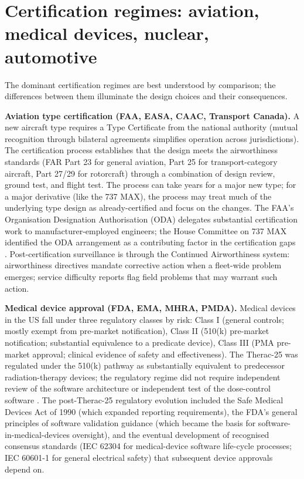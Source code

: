 \section{Certification regimes: aviation, medical devices, nuclear, automotive}

The dominant certification regimes are best understood by comparison; the differences between them illuminate the design choices and their consequences.

\textbf{Aviation type certification (FAA, EASA, CAAC, Transport Canada).} A new aircraft type requires a Type Certificate from the national authority (mutual recognition through bilateral agreements simplifies operation across jurisdictions). The certification process establishes that the design meets the airworthiness standards (FAR Part 23 for general aviation, Part 25 for transport-category aircraft, Part 27/29 for rotorcraft) through a combination of design review, ground test, and flight test. The process can take years for a major new type; for a major derivative (like the 737 MAX), the process may treat much of the underlying type design as already-certified and focus on the changes. The FAA's Organisation Designation Authorisation (ODA) delegates substantial certification work to manufacturer-employed engineers; the House Committee on 737 MAX identified the ODA arrangement as a contributing factor in the certification gaps \cite{acc:house-737max-2020}. Post-certification surveillance is through the Continued Airworthiness system: airworthiness directives mandate corrective action when a fleet-wide problem emerges; service difficulty reports flag field problems that may warrant such action.

\textbf{Medical device approval (FDA, EMA, MHRA, PMDA).} Medical devices in the US fall under three regulatory classes by risk: Class I (general controls; mostly exempt from pre-market notification), Class II (510(k) pre-market notification; substantial equivalence to a predicate device), Class III (PMA pre-market approval; clinical evidence of safety and effectiveness). The Therac-25 was regulated under the 510(k) pathway as substantially equivalent to predecessor radiation-therapy devices; the regulatory regime did not require independent review of the software architecture or independent test of the dose-control software \cite{paper:leveson-turner1993}. The post-Therac-25 regulatory evolution included the Safe Medical Devices Act of 1990 (which expanded reporting requirements), the FDA's general principles of software validation guidance (which became the basis for software-in-medical-devices oversight), and the eventual development of recognised consensus standards (IEC 62304 for medical-device software life-cycle processes; IEC 60601-1 for general electrical safety) that subsequent device approvals depend on.

